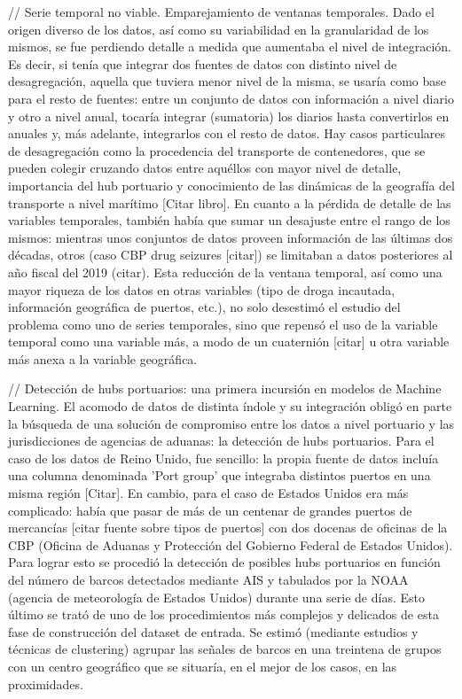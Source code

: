 \documentclass{article}
\begin{document}
// Serie temporal no viable. Emparejamiento de ventanas temporales.
Dado el origen diverso de los datos, así como su variabilidad en la granularidad de los mismos, se fue perdiendo detalle a medida que aumentaba el nivel de integración. Es decir, si tenía que integrar dos fuentes de datos con distinto nivel de desagregación, aquella que tuviera menor nivel de la misma, se usaría como base para el resto de fuentes: entre un conjunto de datos con información a nivel diario y otro a nivel anual, tocaría integrar (sumatoria) los diarios hasta convertirlos en anuales y, más adelante, integrarlos con el resto de datos. Hay casos particulares de desagregación como la procedencia del transporte de contenedores, que se pueden colegir cruzando datos entre aquéllos con mayor nivel de detalle, importancia del hub portuario y conocimiento de las dinámicas de la geografía del transporte a nivel marítimo [Citar libro]. En cuanto a la pérdida de detalle de las variables temporales, también había que sumar un desajuste entre el rango de los mismos: mientras unos conjuntos de datos proveen información de las últimas dos décadas, otros (caso CBP drug seizures [citar]) se limitaban a datos posteriores al año fiscal del 2019 (citar). Esta reducción de la ventana temporal, así como una mayor riqueza de los datos en otras variables (tipo de droga incautada, información geográfica de puertos, etc.), no solo desestimó el estudio del problema como uno de series temporales, sino que repensó el uso de la variable temporal como una variable más, a modo de un cuaternión [citar] u otra variable más anexa a la variable geográfica.

// Detección de hubs portuarios: una primera incursión en modelos de Machine Learning.
El acomodo de datos de distinta índole y su integración obligó en parte la búsqueda de una solución de compromiso entre los datos a nivel portuario y las jurisdicciones de agencias de aduanas: la detección de hubs portuarios. Para el caso de los datos de Reino Unido, fue sencillo: la propia fuente de datos incluía una columna denominada 'Port group' que integraba distintos puertos en una misma región [Citar]. En cambio, para el caso de Estados Unidos era más complicado: había que pasar de más de un centenar de grandes puertos de mercancías [citar fuente sobre tipos de puertos] con dos docenas de oficinas de la CBP (Oficina de Aduanas y Protección del Gobierno Federal de Estados Unidos). Para lograr esto se procedió la detección de posibles hubs portuarios en función del número de barcos detectados mediante AIS y tabulados por la NOAA (agencia de meteorología de Estados Unidos) durante una serie de días. Esto último se trató de uno de los procedimientos más complejos y delicados de esta fase de construcción del dataset de entrada. Se estimó (mediante estudios y técnicas de clustering) agrupar las señales de barcos en una treintena de grupos con un centro geográfico que se situaría, en el mejor de los casos, en las proximidades.
\end{document}
